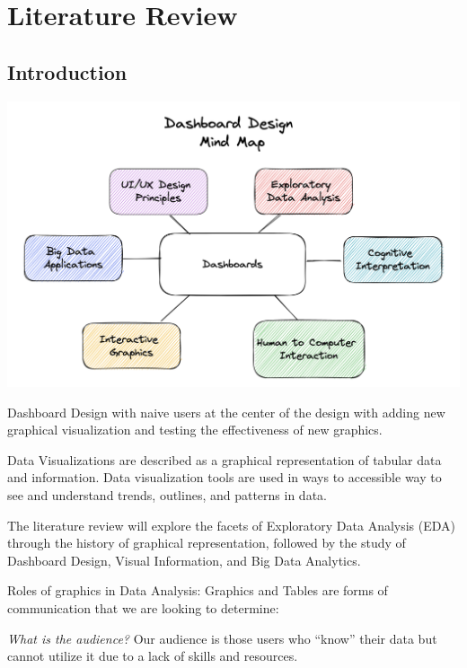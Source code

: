 \documentclass[print]{nuthesis}
\begin{document}
\hypertarget{literature-review}{%
\chapter{Literature Review}\label{literature-review}}

\hypertarget{introduction}{%
\section{Introduction}\label{introduction}}

\begin{center}
\includegraphics[width=\textwidth]{figure/DashboardDesignMap}
\end{center}

Dashboard Design with naive users at the center of the design with adding new graphical visualization and testing the effectiveness of new graphics.

Data Visualizations are described as a graphical representation of tabular data and information. Data visualization tools are used in ways to accessible way to see and understand trends, outlines, and patterns in data.

The literature review will explore the facets of Exploratory Data Analysis (EDA) through the history of graphical representation, followed by the study of Dashboard Design, Visual Information, and Big Data Analytics.

Roles of graphics in Data Analysis:
Graphics and Tables are forms of communication that we are looking to determine:

\emph{What is the audience?}
Our audience is those users who ``know'' their data but cannot utilize it due to a lack of skills and resources.
\end{document}
